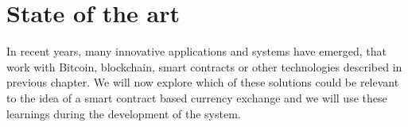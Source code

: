 \section{State of the art}
% 
In recent years, many innovative applications and systems have emerged, that work with Bitcoin, blockchain, smart contracts or other technologies described in previous chapter. We will now explore which of these solutions could be relevant to the idea of a smart contract based currency exchange and we will use these learnings during the development of the system.


% 
